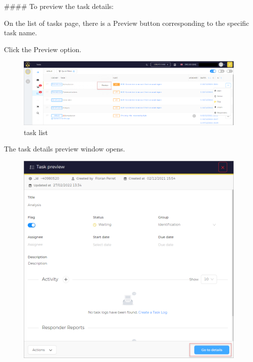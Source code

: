 




\begin{markdown}
#### To preview the task details:

On the list of tasks page, there is a Preview button corresponding to the specific task name.

Click the Preview option.
\end{markdown}

\begin{figure}[H]
    \centering
    \includegraphics[width=\textwidth]{images/docs/analyst/task/preview/task_mainmenu.png}
    \caption{task list}
    \label{fig:modules}
\end{figure}

\begin{markdown}

The task details preview window opens.
\end{markdown}



\begin{figure}[H]
    \centering
    \includegraphics[width=\textwidth]{images/docs/analyst/task/preview/preview-task.png}
    \label{fig:modules}
\end{figure}

